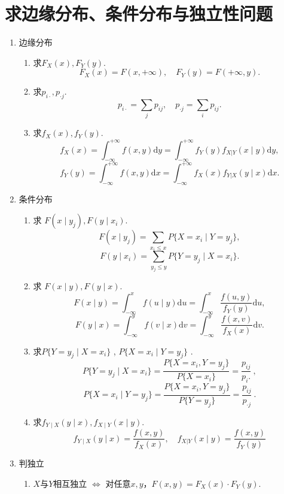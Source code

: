 \section{求边缘分布、条件分布与独立性问题}
\begin{enumerate}
      \item 边缘分布
            \begin{enumerate}
                  \item 求$F_X(x),F_Y(y)$.
                        $$F_{X}(x)=F(x,+\infty) ,\quad F_{Y}(y)=F(+\infty,y).$$
                  \item 求$p_{i\cdot},p_{\cdot j}$.
                        $$p_{i\cdot}=\sum_{j}p_{ij},\quad p_{\cdot j}=\sum_{i}p_{ij}.$$
                  \item 求$f_X(x),f_Y(y)$.
                        $$f_{X}(x)=\int_{-\infty}^{+\infty}f(x,y)\mathrm{d}y=\int_{-\infty}^{+\infty}f_{Y}(y)f_{X|Y}(x\mid y)\mathrm{d}y,$$
                        $$f_{Y}(y)=\int_{-\infty}^{+\infty}f(x,y)\mathrm{d}x=\int_{-\infty}^{+\infty}f_{X}(x)f_{Y|X}(y\mid x)\mathrm{d}x.$$
            \end{enumerate}
      \item 条件分布
            \begin{enumerate}
                  \item 求 $F(x\mid y_j),F(y\mid x_i).$
                        $$F(x\mid y_{j})=\sum_{x_{i}\leq x}P\{X=x_{i}\mid Y=y_{j}\},$$
                        $$F(y\mid x_{i})=\sum_{y_{j}\leq y}P\{Y=y_{j}\mid X=x_{i}\}.$$
                  \item 求 $F(x\mid y),F(y\mid x).$
                        $$F(x\mid y)=\int_{-\infty}^{x}f(u\mid y)\mathrm{d}u=\int_{-\infty}^{x}\frac{f(u,y)}{f_{Y}(y)}\mathrm{d}u,$$
                        $$F(y\mid x)=\int_{-\infty}^{y}f(v\mid x)\mathrm{d}v=\int_{-\infty}^{y}\frac{f(x,v)}{f_{X}(x)}\mathrm{d}v.$$
                  \item 求$P\{ Y= y_{j}\mid X= x_{i}\}$ , $P\{ X= x_{i}\mid Y= y_{j}\}$ .
                        $$P\{Y=y_{j}\mid X=x_{i}\}=\frac{P\{X=x_{i},Y=y_{j}\}}{P\{X=x_{i}\}}=\frac{p_{ij}}{p_{i}.}\:,$$
                        $$P\{X=x_{i}\mid Y=y_{j}\}=\frac{P\Big\{X=x_{i},Y=y_{j}\Big\}}{P\Big\{Y=y_{j}\Big\}}=\frac{p_{ij}}{p_{\cdot j}}\:.$$
                  \item 求$f_{Y\mid X}(y\mid x),f_{X\mid Y}(x\mid y).$
                        $$f_{Y\mid X}(y\mid x)=\frac{f(x,y)}{f_{X}(x)},\quad f_{X|Y}(x\mid y)=\frac{f(x,y)}{f_{Y}(y)}$$
            \end{enumerate}
      \item 判独立
            \begin{enumerate}
                  \item $X$与$Y$相互独立 $\Leftrightarrow$ 对任意$x,y$，$F(x,y)=F_X(x)\cdot F_Y(y)$.


\end{enumerate}
\end{enumerate}
